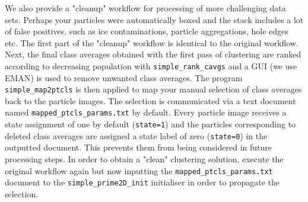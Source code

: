 \documentclass[a4paper,11pt]{article}
\newcommand{\prgname}[1]{\textcolor{NavyBlue}{\texttt{#1}}}
\begin{document}
We also provide a "cleanup" workflow for processing of more challenging data sets. Perhaps your particles were automatically boxed and the stack includes a lot of false positives, such as ice contaminations, particle aggregations, hole edges etc. The first part of the "cleanup" workflow is identical to the original workflow. Next, the final class averages obtained with the first pass of clustering are ranked according to decreasing population with \prgname{simple\_rank\_cavgs} and a GUI (we use EMAN\citep{Ludtke:1999aa,Tang:2007aa}) is used to remove unwanted class averages. The program \prgname{simple\_map2ptcls} is then applied to map your manual selection of class averages back to the particle images. The selection is communicated via a text document named \texttt{mapped\_ptcls\_params.txt} by default. Every particle image receives a state assignment of one by default (\texttt{state=1}) and the particles corresponding to deleted class averages are assigned a state label of zero (\texttt{state=0}) in the outputted document. This prevents them from being considered in future processing steps. In order to obtain a "clean" clustering solution, execute the original workflow again but now inputting the \texttt{mapped\_ptcls\_params.txt} document to the \prgname{simple\_prime2D\_init} initialiser in order to propagate the selection. 
\end{document}
